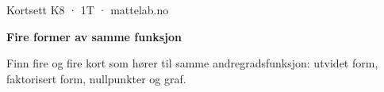 \documentclass[11pt,a4paper]{article}
\begin{document}
\begin{minipage}[t]{0.8\linewidth}\vspace{0pt}
{\sffamily\small\color{dempet}Kortsett K8 · 1T · mattelab.no}\par\vspace{0.25em}
{\fontsize{20}{24}\selectfont\bfseries Fire former av samme funksjon}\par\vspace{0.5em}
Finn fire og fire kort som hører til samme andregradsfunksjon: utvidet form, faktorisert form, nullpunkter og graf.\par{}
\end{minipage}\hfill
\begin{minipage}[t]{0.15\linewidth}\vspace{0pt}\raggedleft
{}
\end{minipage}\par\vspace{0.8em}
\end{document}
